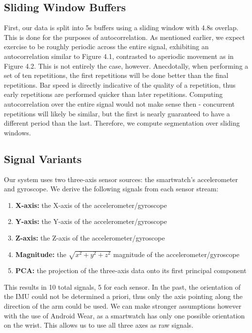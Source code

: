 \subsection{Sliding Window Buffers}
First, our data is split into 5s buffers using a sliding window with 4.8s overlap. This is done for the purposes of autocorrelation. As mentioned earlier, we expect exercise to be roughly periodic across the entire signal, exhibiting an autocorrelation similar to Figure 4.1, contrasted to aperiodic movement as in Figure 4.2. This is not entirely the case, however. Anecdotally, when performing a set of ten repetitions, the first repetitions will be done better than the final repetitions. Bar speed is directly indicative of the quality of a repetition, thus early repetitions are performed quicker than later repetitions. Computing autocorrelation over the entire signal would not make sense then - concurrent repetitions will likely be similar, but the first is nearly guaranteed to have a different period than the last. Therefore, we compute segmentation over sliding windows. 

\subsection{Signal Variants}
Our system uses two three-axis sensor sources: the smartwatch's accelerometer and gyroscope. We derive the following signals from each sensor stream:

\begin{enumerate}
    \item \textbf{X-axis:} the X-axis of the accelerometer/gyroscope
    \item \textbf{Y-axis:} the Y-axis of the accelerometer/gyroscope
    \item \textbf{Z-axis:} the Z-axis of the accelerometer/gyroscope
    \item \textbf{Magnitude:} the $\sqrt{x^2 + y^2 + z^2}$ magnitude of the accelerometer/gyroscope
    \item \textbf{PCA:} the projection of the three-axis data onto its first principal component
\end{enumerate}

This results in 10 total signals, 5 for each sensor. In the past, the orientation of the IMU could not be determined a priori, thus only the axis pointing along the direction of the arm could be used. We can make stronger assumptions however with the use of Android Wear, as a smartwatch has only one possible orientation on the wrist. This allows us to use all three axes as raw signals.

